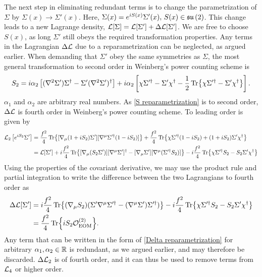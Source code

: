 The next step in eliminating redundant terms is to change the parametrization of $\Sigma$ by $\Sigma(x) \rightarrow \Sigma'(x)$.
Here, $ \Sigma(x) = e^{iS(x)} \Sigma'(x), \, S(x) \in \mathfrak{su}\left(2\right)$. This change leads to a new Lagrange density, $\mathcal{L}[\Sigma] = \mathcal{L}[\Sigma'] + \Delta \mathcal{L}[\Sigma']$.
We are free to choose $S(x)$, as long $\Sigma'$ still obeys the required transformation properties.
Any terms in the Lagrangian $\Delta \mathcal{L}$ due to a reparametrization can be neglected, as argued earlier.
When demanding that $\Sigma'$ obey the same symmetries as $\Sigma$,
the most general transformation to second order in Weinberg's power counting scheme  is~\cite{Scherer2002IntroductionTC}
\begin{equation}
    \label{S reparametrization}
    S_{2} = 
    i \alpha_2 
    \left[
        (\nabla^2 \Sigma') \Sigma^\dagger - \Sigma' (\nabla^2 {\Sigma'})^\dagger
    \right]
    + i \alpha_2
    \left[
        \chi \Sigma'^\dagger - \Sigma' \chi^\dagger 
        - \frac{1}{2} \Tr{\chi \Sigma'^\dagger - \Sigma' \chi^\dagger}
    \right].
\end{equation}
$\alpha_1$ and $\alpha_2$ are arbitrary real numbers. As \cref{S reparametrization} is to second order, $\Delta \mathcal{L}$ is fourth order in Weinberg's power counting scheme.
To leading order is given by
\begin{align*}
    \mathcal{L}_2\left[e^{i S_2}\Sigma '\right]
    & =
    \frac{f^2}{4}\Tr{[\nabla_\mu (1 +i S_2)\Sigma'][\nabla^\mu \Sigma'^\dagger  (1 - i S_2)]}
    + \frac{f^2}{4} \Tr{\chi\Sigma'^\dagger (1 - i S_2) + (1 +i S_2)\Sigma' \chi^\dagger} \\
    & = \mathcal{L}[\Sigma'] + 
    i \frac{f^2}{4}
    \Tr{[\nabla_\mu (S_2\Sigma')][\nabla^\mu\Sigma']^\dagger 
    -  [\nabla_\mu\Sigma'][\nabla^\mu (\Sigma'^\dagger  S_2) ]}
    - i \frac{f^2}{4} \Tr{\chi \Sigma'^\dagger S_2 - S_2 \Sigma' \chi^\dagger}
\end{align*}
Using the properties of the covariant derivative, we may use the product rule and partial integration to write the difference between the two Lagrangians to fourth order as
\begin{align}
    \nonumber
    \Delta \mathcal{L}[\Sigma'] 
    & = 
    i \frac{f^2}{4}
    \Tr{
        (\nabla_\mu S_2)
        (\Sigma' \nabla^\mu \Sigma'^\dagger - (\nabla^\mu \Sigma') \Sigma'^\dagger) 
    }
    - i \frac{f^2}{4} \Tr{\chi \Sigma'^\dagger  S_2 - S_2 \Sigma' \chi^\dagger} \\
    & = 
    \label{Delta reparametrization}
    \frac{f^2}{4} \Tr{i S_2 \mathcal{O}_\mathrm{EOM}^{(2)}}.
\end{align}
Any term that can be written in the form of \cref{Delta reparametrization} for arbitrary $\alpha_1, \alpha_2 \in \mathbb{R}$ is redundant, as we argued earlier, and may therefore be discarded.
$\Delta \mathcal{L}_2$ is of fourth order, and it can thus be used to remove terms from $\mathcal{L}_4$ or higher order.
